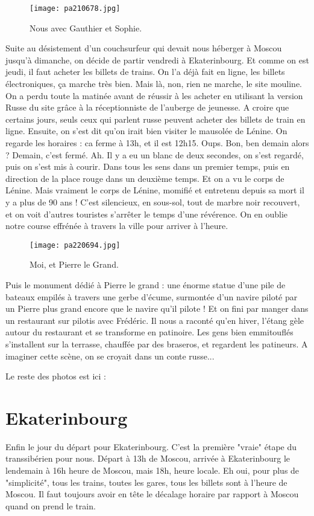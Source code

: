 \documentclass{book}
\begin{document}
\begin{figure}[h]
\centering
\texttt{[image: pa210678.jpg]}
\caption*{ Nous avec Gauthier et Sophie.}
\end{figure}

Suite au désistement d'un couchsurfeur qui devait nous héberger à Moscou jusqu'à dimanche, on décide de partir vendredi à Ekaterinbourg. Et comme on est jeudi, il faut acheter les billets de trains. On l'a déjà fait en ligne, les billets électroniques, ça marche très bien. Mais là, non, rien ne marche, le site mouline. On a perdu toute la matinée avant de réussir à les acheter en utilisant la version Russe du site grâce à la réceptionniste de l'auberge de jeunesse. A croire que certains jours, seuls ceux qui parlent russe peuvent acheter des billets de train en ligne.
Ensuite, on s'est dit qu'on irait bien visiter le mausolée de Lénine. On regarde les horaires : ca ferme à 13h, et il est 12h15. Oups. Bon, ben demain alors ? Demain, c'est fermé. Ah. Il y a eu un blanc de deux secondes, on s'est regardé, puis on s'est mis à courir. Dans tous les sens dans un premier temps, puis en direction de la place rouge dans un deuxième temps. Et on a vu le corps de Lénine. Mais vraiment le corps de Lénine, momifié et entretenu depuis sa mort il y a plus de 90 ans ! C'est silencieux, en sous-sol, tout de marbre noir recouvert, et on voit d'autres touristes s'arrêter le temps d'une révérence. On en oublie notre course effrénée à travers la ville pour arriver à l'heure.


\begin{figure}[h]
\centering
\texttt{[image: pa220694.jpg]}
\caption*{ Moi, et Pierre le Grand.}
\end{figure}

Puis le monument dédié à Pierre le grand : une énorme statue d'une pile de bateaux empilés à travers une gerbe d'écume, surmontée d'un navire piloté par un Pierre plus grand encore que le navire qu'il pilote !
Et on fini par manger dans un restaurant sur pilotis avec Frédéric. Il nous a raconté qu'en hiver, l'étang gèle autour du restaurant et se transforme en patinoire. Les gens bien emmitouflés s'installent sur la terrasse, chauffée par des braseros, et regardent les patineurs. A imaginer cette scène, on se croyait dans un conte russe...

Le reste des photos est ici : 

\chapter{Ekaterinbourg}
Enfin le jour du départ pour Ekaterinbourg.
C'est la première "vraie" étape du transsibérien pour nous. Départ à 13h de Moscou, arrivée à Ekaterinbourg le lendemain à 16h heure de Moscou, mais 18h, heure locale. Eh oui, pour plus de "simplicité", tous les trains, toutes les gares, tous les billets sont à l'heure de Moscou. Il faut toujours avoir en tête le décalage horaire par rapport à Moscou quand on prend le train.
\end{document}
